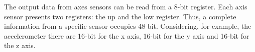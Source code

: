 

The output data from  axes sensors can be read from a 8-bit register. Each axis sensor presents two registers: the  up  and the low register. Thus, a complete information from a specific sensor occupies 48-bit. Considering, for example, the accelerometer there are 16-bit for the x axis, 16-bit for the y axis and 16-bit for the z axis.

